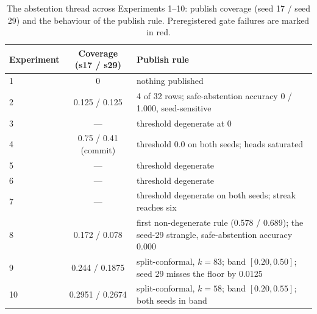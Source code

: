\documentclass[10pt,a4paper]{article}
\newcommand{\fail}[1]{\textcolor{failred}{#1}}
\begin{document}
\begin{table}[htbp]
\caption{The abstention thread across Experiments 1--10: publish coverage
(seed 17 / seed 29) and the behaviour of the publish rule. Preregistered gate
failures are marked in red.}
\label{tab:abstention-arc}
\centering\footnotesize
\begin{tabularx}{\textwidth}{@{}lcX@{}}
\toprule
Experiment & Coverage (s17 / s29) & Publish rule \\
\midrule
1 & 0 & nothing published \\
2 & 0.125 / 0.125 & 4 of 32 rows; safe-abstention accuracy 0 / 1.000, seed-sensitive \\
3 & --- & threshold degenerate at 0 \\
4 & 0.75 / 0.41 (commit) & threshold 0.0 on both seeds; heads saturated \\
5 & --- & threshold degenerate \\
6 & --- & threshold degenerate \\
7 & --- & threshold degenerate on both seeds; streak reaches six \\
8 & 0.172 / 0.078 & first non-degenerate rule (0.578 / 0.689); the seed-29 strangle, safe-abstention accuracy \fail{0.000} \\
9 & 0.244 / \fail{0.1875} & split-conformal, $k=83$; band $[0.20,0.50]$; seed 29 misses the floor by 0.0125 \\
10 & 0.2951 / 0.2674 & split-conformal, $k=58$; band $[0.20,0.55]$; both seeds in band \\
\bottomrule
\end{tabularx}
\end{table}
\end{document}
